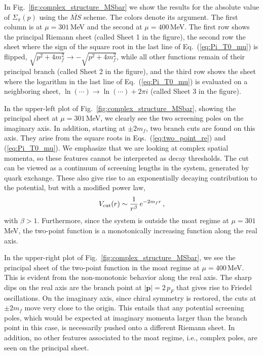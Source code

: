 \documentclass[reprint,english,superscriptaddress,preprintnumbers,amsmath,amssymb,aps,prd]{revtex4-2}
\def\eq#1{(\ref{#1})}
\def\Eq#1{Eq.~(\ref{#1})}
\def\Fig#1{Fig.~\ref{#1}}
\begin{document}
In \Fig{fig:complex_structure_MSbar} we show the results for the absolute value of $\Sigma_\pi(p)$ using the $\overline{MS}$ scheme. The colors denote its argument. The first column is at $\mu=301$\,MeV and the second at $\mu=400$\,MeV. The first row shows the principal Riemann sheet (called Sheet 1 in the figure), the second row the sheet where the sign of the square root in the last line of \Eq{eq:Pi_T0_mu} is flipped,  $\sqrt{p^2+4m^2_f} \rightarrow -\sqrt{p^2+4m^2_f}$, while all other functions remain of their principal branch (called Sheet 2 in the figure), and the third row shows the sheet where the logarithm in the last line of \Eq{eq:Pi_T0_mu} is evaluated on a neighboring sheet, $\ln(\cdots) \rightarrow \ln(\cdots) + 2\pi i$ (called Sheet 3 in the figure). 



In the upper-left plot of \Fig{fig:complex_structure_MSbar}, showing the principal sheet at $\mu=301$\,MeV, we clearly see the two screening poles on the imaginary axis. 
In addition, starting at $\pm 2m_f$, two branch cuts are found on this axis. They arise from the square roots in Eqs.\ \eq{eq:two_point_re} and \eq{eq:Pi_T0_mu}. We emphasize that we are looking at complex spatial momenta, so these features cannot be interpreted as decay thresholds. The cut can be viewed as a continuum of screening lengths in the system, generated by quark exchange. These also give rise to an exponentially decaying contribution to the potential, but with a modified power law,
\begin{align}
V_{\rm cut}(r) \sim \frac{1}{r^\beta}\, e^{- 2 m_f r}\,,
\end{align}
with $\beta > 1$. Furthermore, since the system is outside the moat regime at $\mu=301$\,MeV, the two-point function is a monotonically increasing function along the real axis. 


In the upper-right plot of \Fig{fig:complex_structure_MSbar}, we see the principal sheet of the two-point function in the moat regime at $\mu=400$\,MeV. This is evident from the non-monotonic behavior along the real axis. The sharp dips on the real axis are the branch point at $|\mathbf{p}|=2\,p_F$ that gives rise to Friedel oscillations. On the imaginary axis, since chiral symmetry is restored, the cuts at $\pm 2 m_f$ move very close to the origin.
This entails that any potential screening poles, which would be expected at imaginary momenta larger than the branch point in this case, is necessarily pushed onto a different Riemann sheet. In addition, no other features associated to the moat regime, i.e., complex poles, are seen on the principal sheet.
\end{document}
